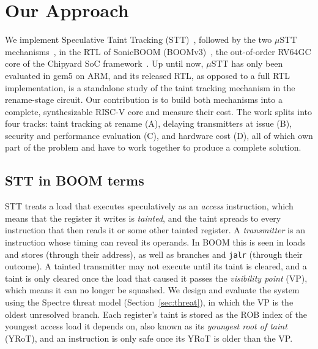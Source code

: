 \section{Our Approach}
\label{sec:approach}


We implement Speculative Taint Tracking (STT)~\cite{Yu:STT:2019}, followed by
the two $\mu$STT mechanisms~\cite{Chen:uSTT:2025}, in the RTL of SonicBOOM
(BOOMv3)~\cite{Zhao:SonicBOOM:2020}, the out-of-order RV64GC core of the
Chipyard SoC framework~\cite{Amid:Chipyard:2020}. Up until now, $\mu$STT has only
been evaluated in gem5 on ARM, and its released RTL, as opposed to a full RTL implementation,
is a standalone study of the taint tracking mechanism in the rename-stage circuit. 
Our contribution is to build both mechanisms into a complete, synthesizable RISC-V core and 
measure their cost. The work splits into four tracks: taint tracking at rename (A), delaying 
transmitters at issue (B), security and performance evaluation (C), and hardware cost (D), 
all of which own part of the problem and have to work together to produce a complete solution.

\subsection{STT in BOOM terms}
STT treats a load that executes speculatively as an \emph{access}
instruction, which means that the register it writes is \emph{tainted}, 
and the taint spreads to every instruction that then reads it or some other
tainted register. A \emph{transmitter} is an instruction whose timing can 
reveal its operands. In BOOM this is seen in loads and stores (through their
address), as well as branches and \texttt{jalr} (through their outcome).
A tainted transmitter may not execute until its taint is cleared, and a taint is
only cleared once the load that caused it passes the \emph{visibility point} (VP),
which means it can no longer be squashed. We design and evaluate the system using the Spectre 
threat model (Section~\ref{sec:threat}), in which the VP is the oldest unresolved 
branch. Each register's taint is stored as the ROB index of the youngest access load it 
depends on, also known as its \emph{youngest root of taint} (YRoT), and an 
instruction is only safe once its YRoT is older than the VP.

